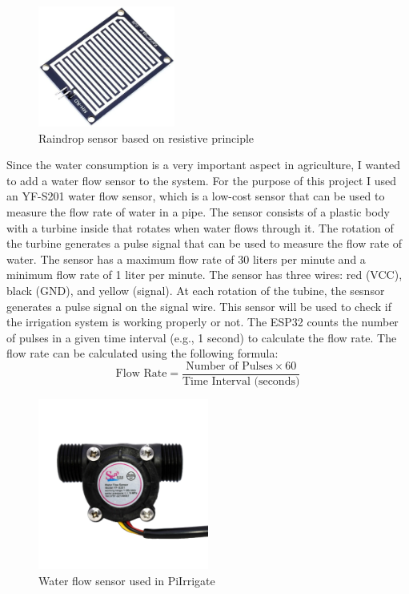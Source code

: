 \begin{figure}[H]
    \centering
    \includegraphics[width=0.4\textwidth]{images/rain-detector-sensor.png}
    \caption{Raindrop sensor based on resistive principle}
    \label{fig:raindrop-sensor}
\end{figure}

Since the water consumption is a very important aspect in agriculture, 
I wanted to add a water flow sensor to the system. For the purpose of this project I used an 
YF-S201 water flow sensor, which is a low-cost sensor that can be used to measure the flow rate of water in a pipe.
The sensor consists of a plastic body with a 
turbine inside that rotates when water flows through it.
The rotation of the turbine generates a pulse signal that can be used to measure the 
flow rate of water.
The sensor has a maximum flow rate of 30 liters per minute and a minimum 
flow rate of 1 liter per minute.
The sensor has three wires: red (VCC), black (GND), and yellow (signal).
At each rotation of the tubine, the sesnsor generates a pulse signal on the signal wire.
This sensor will be used to check if the irrigation system is working properly or not.
The ESP32 counts the number of pulses in a given time interval 
(e.g., 1 second) to calculate the flow rate.
The flow rate can be calculated using the following formula:
\begin{equation}
    \text{Flow Rate} = \frac{\text{Number of Pulses} \times 60}{\text{Time Interval (seconds)}}
\end{equation}
\begin{figure}[H]
    \centering
    \includegraphics[width=0.5\textwidth]{images/water-flow.jpg}
    \caption{Water flow sensor used in PiIrrigate}
    \label{fig:water-flow-sensor}
\end{figure}

